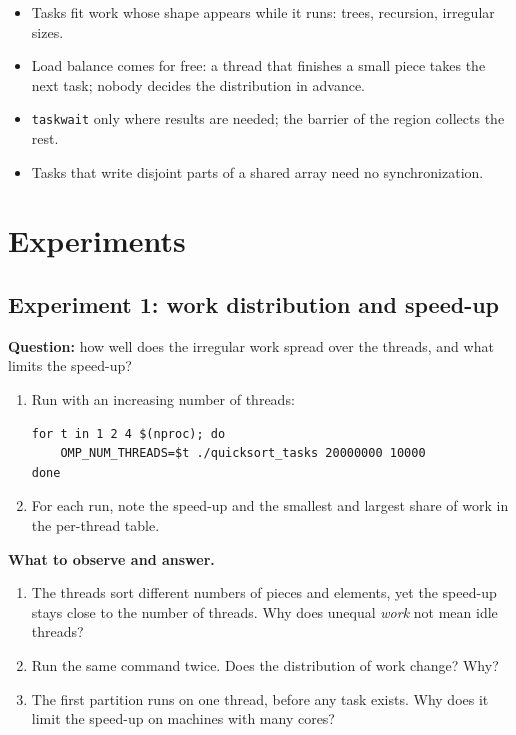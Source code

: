 \documentclass[11pt,a4paper]{article}
\let\origtexttt\texttt
\renewcommand{\texttt}[1]{\textcolor{black!60}{\origtexttt{#1}}}
\begin{document}
\begin{keyidea}
\begin{itemize}
  \item Tasks fit work whose shape appears while it runs: trees, recursion, irregular sizes.
  \item Load balance comes for free: a thread that finishes a small piece takes the next
        task; nobody decides the distribution in advance.
  \item \texttt{taskwait} only where results are needed; the barrier of the region collects
        the rest.
  \item Tasks that write disjoint parts of a shared array need no synchronization.
\end{itemize}
\end{keyidea}

\section{Experiments}

\subsection*{Experiment 1: work distribution and speed-up}
\begin{experiment}
\textbf{Question:} how well does the irregular work spread over the threads, and what
limits the speed-up?
\begin{enumerate}
  \item Run with an increasing number of threads:
\begin{lstlisting}[style=sh]
for t in 1 2 4 $(nproc); do
    OMP_NUM_THREADS=$t ./quicksort_tasks 20000000 10000
done
\end{lstlisting}
  \item For each run, note the speed-up and the smallest and largest share of work in the
        per-thread table.
\end{enumerate}
\textbf{What to observe and answer.}
\begin{enumerate}
  \item The threads sort different numbers of pieces and elements, yet the speed-up stays
        close to the number of threads. Why does unequal \emph{work} not mean idle threads?
  \item Run the same command twice. Does the distribution of work change? Why?
  \item The first partition runs on one thread, before any task exists. Why does it limit
        the speed-up on machines with many cores?
\end{enumerate}
\end{experiment}
\end{document}
